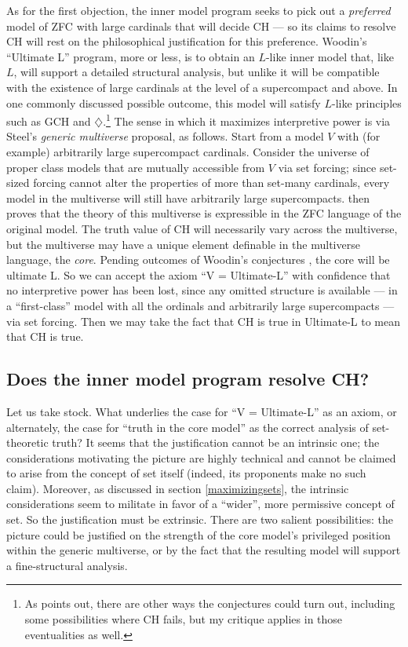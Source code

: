 \documentclass[letterpaper,12pt]{article}
\begin{document}
As for the first objection, the inner model program seeks to pick out a \emph{preferred} model of ZFC with large cardinals that will decide CH --- so its claims to resolve CH will rest on the philosophical justification for this preference. Woodin's ``Ultimate L'' program, more or less, is to obtain an $L$-like inner model that, like $L$, will support a detailed structural analysis, but unlike it will be compatible with the existence of large cardinals at the level of a supercompact and above. In one commonly discussed possible outcome, this model will satisfy $L$-like principles such as GCH and $\diamondsuit$.\footnote{As \cite{sep-continuum-hypothesis} points out, there are other ways the conjectures could turn out, including some possibilities where CH fails, but my critique applies in those eventualities as well.} The sense in which it maximizes interpretive power is via Steel's \emph{generic multiverse} proposal, as follows. Start from a model $V$ with (for example) arbitrarily large supercompact cardinals. Consider the universe of proper class models that are mutually accessible from $V$ via set forcing; since set-sized forcing cannot alter the properties of more than set-many cardinals, every model in the multiverse will still have arbitrarily large supercompacts. \cite{steel2012godel} then proves that the theory of this multiverse is expressible in the ZFC language of the original model. The truth value of CH will necessarily vary across the multiverse, but the multiverse may have a unique element definable in the multiverse language, the \emph{core}. Pending outcomes of Woodin's conjectures \citep{woodin2011suitable}, the core will be ultimate L. So we can accept the axiom ``V = Ultimate-L'' with confidence that no interpretive power has been lost, since any omitted structure is available --- in a ``first-class'' model with all the ordinals and arbitrarily large supercompacts --- via set forcing. Then we may take the fact that CH is true in Ultimate-L to mean that CH is true.

\subsection{Does the inner model program resolve CH?}
Let us take stock. What underlies the case for ``V = Ultimate-L'' as an axiom, or alternately, the case for ``truth in the core model'' as the correct analysis of set-theoretic truth? It seems that the justification cannot be an intrinsic one; the considerations motivating the picture are highly technical and cannot be claimed to arise from the concept of set itself (indeed, its proponents make no such claim). Moreover, as discussed in section \ref{maximizingsets}, the intrinsic considerations seem to militate in favor of a ``wider'', more permissive concept of set. So the justification must be extrinsic. There are two salient possibilities: the picture could be justified on the strength of the core model's privileged position within the generic multiverse, or by the fact that the resulting model will support a fine-structural analysis.
\end{document}
